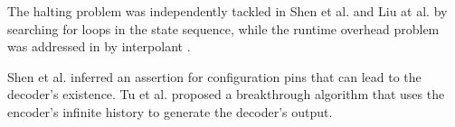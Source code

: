 \documentclass[twocolumn]{article}
\makeatletter
\def\subsection{\@startsection {subsection}{2}{\z@}{16pt plus 2pt minus 2pt}
{6pt plus 2pt minus 2pt}{\normalsize\sl
\edef\@svsec{\thesubsection.\ }}}
\def\thesubsection{\Alph{subsection}}
\makeatother
\begin{document}
The halting problem was independently tackled in Shen et al.\cite{ShenTCAD11} and Liu at al.\cite{LiuICCAD11} by searching for loops in the state sequence,
while the runtime overhead problem was addressed in \cite{ShenTCAD12,LiuICCAD11} by interpolant \cite{InterpBoolFunction}.

Shen et al. \cite{ShenTCAD12} inferred an assertion for configuration pins
that can lead to the decoder's existence.
Tu et al.\cite{TuDAC13} proposed a breakthrough algorithm that 
uses the encoder's infinite history to generate the decoder's output.

% 
% 
% 
\end{document}
